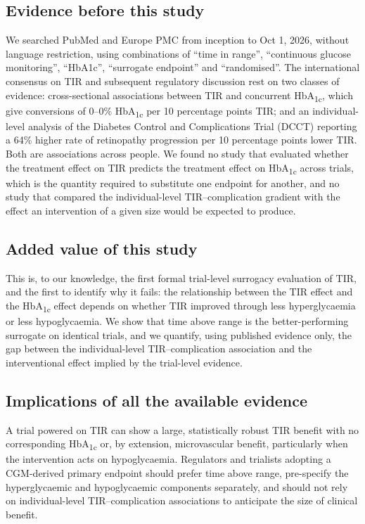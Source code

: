 \documentclass[11pt,a4paper]{article}
\newcommand{\pp}{percentage points}
\begin{document}
\subsection*{Evidence before this study}
We searched PubMed and Europe PMC from inception to Oct 1, 2026, without language restriction, using
combinations of ``time in range'', ``continuous glucose monitoring'', ``HbA1c'', ``surrogate endpoint''
and ``randomised''. The international consensus on TIR and subsequent regulatory discussion rest on two
classes of evidence: cross-sectional associations between TIR and concurrent HbA\textsubscript{1c}, which
give conversions of 0--0\% HbA\textsubscript{1c} per 10 \pp{} TIR;
and an individual-level analysis of the Diabetes Control and Complications Trial (DCCT) reporting a 64\%
higher rate of retinopathy progression per 10 \pp{} lower TIR. Both are associations across people. We
found no study that evaluated whether the treatment effect on TIR predicts the treatment effect on
HbA\textsubscript{1c} across trials, which is the quantity required to substitute one endpoint for another,
and no study that compared the individual-level TIR--complication gradient with the effect an intervention
of a given size would be expected to produce.

\subsection*{Added value of this study}
This is, to our knowledge, the first formal trial-level surrogacy evaluation of TIR, and the first to
identify why it fails: the relationship between the TIR effect and the HbA\textsubscript{1c} effect depends
on whether TIR improved through less hyperglycaemia or less hypoglycaemia. We show that time above range
is the better-performing surrogate on identical trials, and we quantify, using published evidence only,
the gap between the individual-level TIR--complication association and the interventional effect implied by
the trial-level evidence.

\subsection*{Implications of all the available evidence}
A trial powered on TIR can show a large, statistically robust TIR benefit with no corresponding
HbA\textsubscript{1c} or, by extension, microvascular benefit, particularly when the intervention acts on
hypoglycaemia. Regulators and trialists adopting a CGM-derived primary endpoint should prefer time above
range, pre-specify the hyperglycaemic and hypoglycaemic components separately, and should not rely on
individual-level TIR--complication associations to anticipate the size of clinical benefit.
\end{document}
